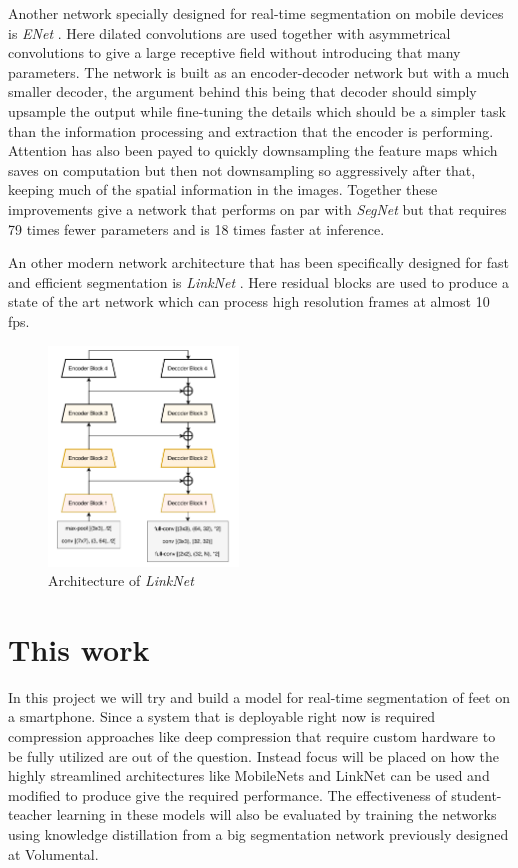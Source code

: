 \documentclass{kththesis}
\newcommand{\bibentry}[1]{\parencite{#1}}
\begin{document}
Another network specially designed for real-time segmentation on mobile devices
is \emph{ENet} \bibentry{paszke2016enet}. Here dilated convolutions are used
together with asymmetrical convolutions to give a large receptive field without
introducing that many parameters. The network is built as an encoder-decoder
network but with a much smaller decoder, the argument behind this being that
decoder should simply upsample the output while fine-tuning the details which
should be a simpler task than the information processing and extraction that the
encoder is performing. Attention has also been payed to quickly downsampling the
feature maps which saves on computation but then not downsampling so
aggressively after that, keeping much of the spatial information in the images.
Together these improvements give a network that performs on par with
\emph{SegNet} but that requires 79 times fewer parameters and is 18 times faster
at inference. 

An other modern network architecture that has been specifically designed for fast and
efficient segmentation is \textit{LinkNet}
\parencite{chaurasia2017linknet}. Here residual blocks \parencite{residual} are used to produce a
state of the art network which can process high resolution frames at almost 10
fps.

\begin{figure}[h]
  \centering
  \includegraphics[width=0.45\textwidth]{LinkNet}
  \caption{Architecture of \textit{LinkNet}}
  \label{fig:LinkNet}
\end{figure}

\section{This work}
In this project we will try and build a model for real-time segmentation of feet
on a smartphone. Since a system that is deployable right now is required
compression approaches like deep compression that require custom hardware to be
fully utilized are out of the question. Instead focus will be placed on how
the highly streamlined architectures like MobileNets and LinkNet can be used and
modified to produce give the required performance. The effectiveness of
student-teacher learning in these models will also be evaluated by training the
networks using knowledge distillation from a big segmentation network previously
designed at Volumental.
\end{document}
